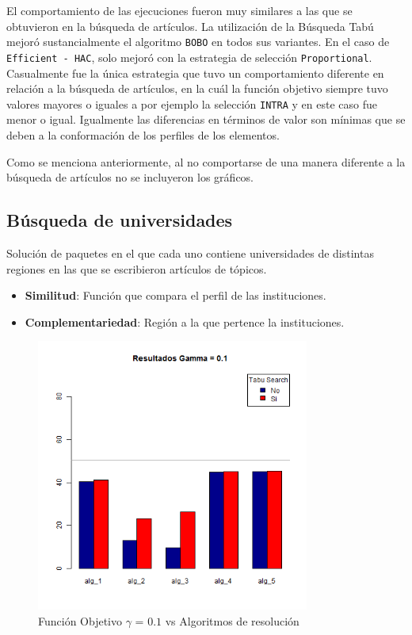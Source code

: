 El comportamiento de las ejecuciones fueron muy similares a las que se obtuvieron en la búsqueda de artículos. La utilización de la Búsqueda Tabú mejoró sustancialmente el algoritmo \texttt{BOBO} en todos sus variantes. En el caso de \texttt{Efficient - HAC}, solo mejoró con la estrategia de selección \texttt{Proportional}. Casualmente fue la única estrategia que tuvo un comportamiento diferente en relación a la búsqueda de artículos, en la cuál la función objetivo siempre tuvo valores mayores o iguales a por ejemplo la selección \texttt{INTRA} y en este caso fue menor o igual. Igualmente las diferencias en términos de valor son mínimas que se deben a la conformación de los perfiles de los elementos.

Como se menciona anteriormente, al no comportarse de una manera diferente a la búsqueda de artículos no se incluyeron los gráficos.
\newpage
\subsection{Búsqueda de universidades}\label{res:busInstituciones}
Solución de paquetes en el que cada uno contiene universidades de distintas regiones en las que se escribieron artículos de tópicos.
\begin{itemize}
  \item \textbf{Similitud}: Función que compara el perfil de las instituciones.
  \item \textbf{Complementariedad}: Región a la que pertence la instituciones.
\end{itemize}

\begin{figure}[H]
  \centering
    \includegraphics[width=0.8\textwidth]{resultados/affiliations/Graficos_agrupados/gamma01-affiliations.png}
  \caption{Función Objetivo $\gamma$ = $0.1$ vs Algoritmos de resolución}
  \label{res:img-affiliations-agr-gamma01}
\end{figure}

